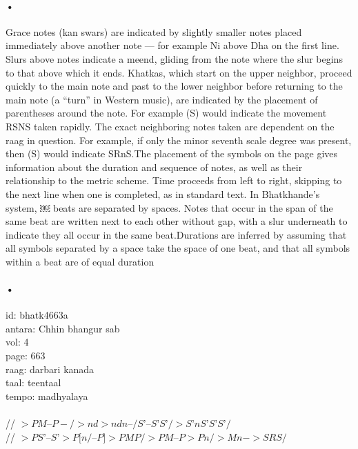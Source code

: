 \documentclass[12pt,a4paper]{article}
\begin{document}
\paragraph{•}
Grace notes (kan swars) are indicated by slightly smaller notes placed immediately above another note — for example Ni above Dha on the first line. Slurs above notes indicate a meend, gliding from the note where the slur begins to that above which it ends. Khatkas, which start on the upper neighbor, proceed quickly to the main note and past to the lower neighbor before returning to the main note (a “turn” in Western music), are indicated by the placement of parentheses around the note. For example (S) would indicate the movement RSNS taken rapidly. The exact neighboring notes taken are dependent on the raag in question. For example, if only the minor seventh scale degree was present, then (S) would indicate SRnS.The placement of the symbols on the page gives information about the duration and sequence of notes, as well as their relationship to the metric scheme. Time proceeds from left to right, skipping to the next line when one is completed, as in standard text. In Bhatkhande's system,
￼
beats are separated by spaces. Notes that occur in the span of the same beat are written next to each other without gap, with a slur underneath to indicate they all occur in the same beat.Durations are inferred by assuming that all symbols separated by a space take the space of one beat, and that all symbols within a beat are of equal duration
\paragraph{•}
 id: bhatk4663a \\
antara: Chhin bhangur sab \\
vol: 4 \\
page: 663 \\
raag: darbari kanada \\
taal: teentaal \\ 
tempo: madhyalaya \\ \\
// $>PM – P - / >nd >nd n – / S’ – S’ S’ / >S’n S’ S’ S’/$ \\
// $>PS’ – S’ >P[n / $–$ P] >PM P / >PM – P >Pn / >Mn - >SR S /$ \\ \\
\end{document}
